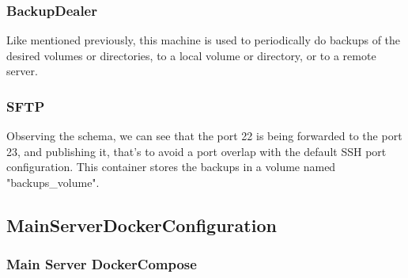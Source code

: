     \subsubsection[Backup\_dealer]{BackupDealer}
    \begin{flushleft}
       Like mentioned previously, this machine is used to periodically do backups of the desired volumes or directories,
       to a local volume or directory, or to a remote server.
    \end{flushleft}

    \subsubsection[SFTP]{SFTP}
    \begin{flushleft}
        Observing the schema, we can see that the port 22 is being forwarded to the port 23, and publishing it, that's
        to avoid a port overlap with the default SSH port configuration.
        This container stores the backups in a volume named "backups\_volume".
    \end{flushleft}

    \newpage
    \subsection[Main Server Docker Configuration]{MainServerDockerConfiguration}\label{subsec:mainserverdockerconfiguration}
    \subsubsection[Main Server Docker-Compose]{Main Server DockerCompose}
    
